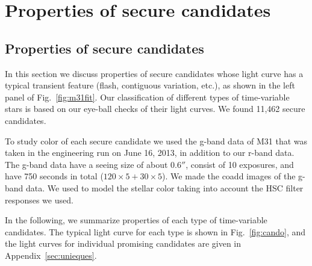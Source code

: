 \documentclass[iop, apj]{emulateapj}
\newcommand{\?}{\stackrel{?}{=}}
\begin{document}
\section{Properties of secure candidates}
\label{sec:obs2}

\subsection{Properties of secure candidates}
\label{sec:candidates}
In this section we discuss properties of secure candidates whose light curve has a typical transient feature (flash, contiguous variation, etc.), as shown in the left panel of Fig.~\ref{fig:m31fit}. 
Our classification of different types of time-variable stars is based on our eye-ball checks of their light curves. We found 11,462 secure candidates. 

To study color of each secure candidate we used the g-band data of M31 that was taken in the engineering run on June 16, 2013, in addition to our r-band data. The g-band data have a seeing size of about $0.6''$, consist of 10 exposures,  and have 750 seconds in total ($120\times 5 + 30\times 5$). 
We made the coadd images of the g-band data. 
We used \citet{Kurucz:93} to model the stellar color taking into account the HSC filter responses we used. 

In the following, we summarize properties of each type of time-variable candidates. The typical light curve for each type is shown in Fig.~\ref{fig:cando}, and the light curves for individual promising candidates are given in Appendix~\ref{sec:unieques}.  

\end{document}
